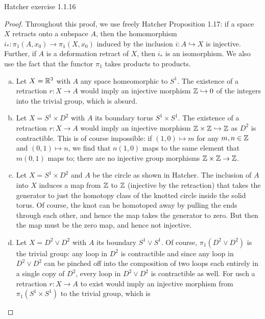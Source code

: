 \documentclass{../../mathnotes}
\begin{document}
\begin{prop}
    Hatcher exercise 1.1.16
\end{prop}
\begin{proof}
    Throughout this proof, we use freely Hatcher Proposition 1.17: if a space $X$ retracts onto
    a subspace $A$, then the homomorphism $i_*:\pi_1(A,x_0)\to\pi_1(X,x_0)$ induced by the inclusion
    $i:A\hookrightarrow X$ is injective. Further, if $A$ is a deformation retract of $X$, then
    $i_*$ is an isomorphism. We also use the fact that the functor $\pi_1$ takes
    products to products.
    \begin{enumerate}[(a)]
        \item Let $X=\mathbb{R}^3$ with $A$ any space homeomorphic to $S^1$. The existence of a
            retraction $r:X\to A$ would imply an injective morphism $\mathbb{Z}\hookrightarrow 0$ of
            the integers into the trivial group, which is absurd.
        \item Let $X=S^1\times D^2$ with $A$ its boundary torus $S^1\times S^1$. The existence
            of a retraction $r:X\to A$ would imply an injective morphism
            $\mathbb{Z}\times\mathbb{Z}\hookrightarrow\mathbb{Z}$ as $D^2$ is contractible. This is of course impossible:
            if $(1,0)\mapsto m$ for any $m,n\in\mathbb{Z}$ and $(0,1)\mapsto n$, we find that
            $n(1,0)$ maps to the same element that $m(0,1)$ maps to; there are no injective group
            morphisms $\mathbb{Z}\times\mathbb{Z}\to\mathbb{Z}$.
        \item Let $X=S^1\times D^2$ and $A$ be the circle as shown in Hatcher. The inclusion of
            $A$ into $X$ induces a map from $\mathbb{Z}$ to $\mathbb{Z}$ (injective by the retraction) that takes
            the generator to just the homotopy class of the knotted circle inside the solid torus.
            Of course, the knot can be homotoped away by pulling the ends through each other, and
            hence the map takes the generator to zero. But then the map must be the zero map, and
            hence not injective.
        \item Let $X=D^2\vee D^2$ with $A$ its boundary $S^1\vee S^1$. Of course,
            $\pi_1(D^2\vee D^2)$ is the trivial group: any loop in $D^2$ is contractible
            and since any loop in $D^2\vee D^2$ can be pinched off into the composition
            of two loops each entirely in a single copy of $D^2$, every loop in $D^2\vee D^2$
            is contractible as well. For usch a retraction $r:X\to A$ to exist would imply
            an injective morphism from $\pi_1(S^1\times S^1)$ to the trivial group, which is

\end{enumerate}
\end{proof}
\end{document}
